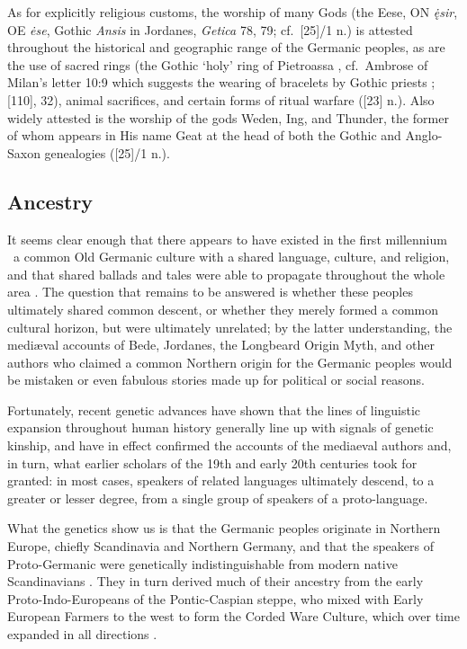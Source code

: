   As for explicitly religious customs, the worship of many Gods (the Eese, ON \emph{ę̇sir}, OE \emph{ėse}, Gothic \emph{Ansis} in Jordanes, \emph{Getica} 78, 79; cf.~[25]/1 n.) is attested throughout the historical and geographic range of the Germanic peoples, as are the use of sacred rings (the Gothic ‘holy’ ring of Pietroassa \parencites[280]{Antonsen2002}[173--174]{MacLeod2006}, cf.~Ambrose of Milan’s letter 10:9 which suggests the wearing of bracelets by Gothic priests \parencite[425]{Capelle2010}; [110],  32), animal sacrifices, and certain forms of ritual warfare ([23] n.).
  Also widely attested is the worship of the gods Weden, Ing, and Thunder, the former of whom appears in His name Geat at the head of both the Gothic and Anglo-Saxon genealogies ([25]/1 n.).

  \subsection{Ancestry}

  It seems clear enough that there appears to have existed in the first millennium \ce\ a common Old Germanic culture with a shared language, culture, and religion, and that shared ballads and tales were able to propagate throughout the whole area \parencite{Neidorf2013}.  The question that remains to be answered is whether these peoples ultimately shared common descent, or whether they merely formed a common cultural horizon, but were ultimately unrelated; by the latter understanding, the mediæval accounts of Bede, Jordanes, the Longbeard Origin Myth, and other authors who claimed a common Northern origin for the Germanic peoples would be mistaken or even fabulous stories made up for political or social reasons.

  Fortunately, recent genetic advances have shown that the lines of linguistic expansion throughout human history generally line up with signals of genetic kinship, and have in effect confirmed the accounts of the mediaeval authors and, in turn, what earlier scholars of the 19th and early 20th centuries took for granted: in most cases, speakers of related languages ultimately descend, to a greater or lesser degree, from a single group of speakers of a proto-language.

  What the genetics show us is that the Germanic peoples originate in Northern Europe, chiefly Scandinavia and Northern Germany, and that the speakers of Proto-Germanic were genetically indistinguishable from modern native Scandinavians \parencites{McColl2024}{McColl2026}.  They in turn derived much of their ancestry from the early Proto-Indo-Europeans of the Pontic-Caspian steppe, who mixed with Early European Farmers to the west to form the Corded Ware Culture, which over time expanded in all directions \parencite{McColl2024}.

